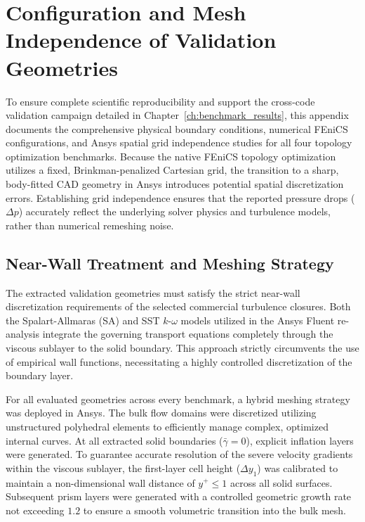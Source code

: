\chapter{Configuration and Mesh Independence of Validation Geometries}
\label{app:validation_configurations}

\providecommand{\meshplaceholder}[1]{%
	\fbox{\parbox[c][0.20\textheight][c]{0.88\linewidth}{\centering \textbf{Placeholder}\\[0.5em]#1}}%
}

To ensure complete scientific reproducibility and support the cross-code validation campaign detailed in Chapter~\ref{ch:benchmark_results}, this appendix documents the comprehensive physical boundary conditions, numerical FEniCS configurations, and Ansys spatial grid independence studies for all four topology optimization benchmarks. Because the native FEniCS topology optimization utilizes a fixed, Brinkman-penalized Cartesian grid, the transition to a sharp, body-fitted CAD geometry in Ansys introduces potential spatial discretization errors. Establishing grid independence ensures that the reported pressure drops ($\Delta p$) accurately reflect the underlying solver physics and turbulence models, rather than numerical remeshing noise.

\section{Near-Wall Treatment and Meshing Strategy}
\label{sec:app_mesh_strategy}
The extracted validation geometries must satisfy the strict near-wall discretization requirements of the selected commercial turbulence closures. Both the Spalart-Allmaras (SA) and SST $k$-$\omega$ models utilized in the Ansys Fluent re-analysis integrate the governing transport equations completely through the viscous sublayer to the solid boundary. This approach strictly circumvents the use of empirical wall functions, necessitating a highly controlled discretization of the boundary layer.

For all evaluated geometries across every benchmark, a hybrid meshing strategy was deployed in Ansys. The bulk flow domains were discretized utilizing unstructured polyhedral elements to efficiently manage complex, optimized internal curves. At all extracted solid boundaries ($\bar{\gamma} = 0$), explicit inflation layers were generated. To guarantee accurate resolution of the severe velocity gradients within the viscous sublayer, the first-layer cell height ($\Delta y_1$) was calibrated to maintain a non-dimensional wall distance of $y^+ \le 1$ across all solid surfaces. Subsequent prism layers were generated with a controlled geometric growth rate not exceeding $1.2$ to ensure a smooth volumetric transition into the bulk mesh.

